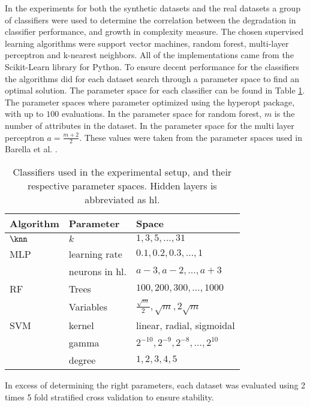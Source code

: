 In the experiments for both the synthetic datasets and the real datasets a group of classifiers were used to determine the correlation between the degradation in classifier performance, and growth in complexity measure. The chosen supervised learning algorithms were support vector machines, random forest, multi-layer perceptron and k-nearest neighbors. All of the implementations came from the Scikit-Learn library for Python. To ensure decent performance for the classifiers the algorithms did for each dataset search through a parameter space to find an optimal solution. The parameter space for each classifier can be found in Table \ref{tab:param_space}. The parameter spaces where parameter optimized using the hyperopt package, with up to $100$ evaluations. In the parameter space for random forest, $m$ is the number of attributes in the dataset. In the parameter space for the multi layer perceptron $a=\frac{m+2}{2}$. These values were taken from the parameter spaces used in Barella et al. \cite{DBLP:journals/isci/BarellaGSLC21}.
\begin{table}[tbp]
    \centering
    \begin{tabular}{lll}
        \toprule
        Algorithm & Parameter & Space \\
        \midrule
        $\knn$ & $k$ & $1,3,5,\dots,31$ \\ 
        \midrule
        MLP & learning rate & $0.1,0.2,0.3,\dots,1$ \\
                            & neurons in hl. & $a-3,a-2,\dots,a+3$ \\
        \midrule
        RF & Trees & $100,200,300,\dots,1000$ \\
           & Variables & $\frac{\sqrt{m}}{2},\sqrt{m},2\sqrt{m}$ \\
        \midrule 
        SVM & kernel & linear, radial, sigmoidal \\
            & gamma & $2^{-10},2^{-9},2^{-8},\dots,2^{10}$ \\
            & degree & $1,2,3,4,5$ \\
        \bottomrule
    \end{tabular}
    \caption{\label{tab:param_space}Classifiers used in the experimental setup, and their respective parameter spaces. Hidden layers is abbreviated as hl.}
\end{table}
In excess of determining the right parameters, each dataset was evaluated using 2 times 5 fold stratified cross validation to ensure stability. 

